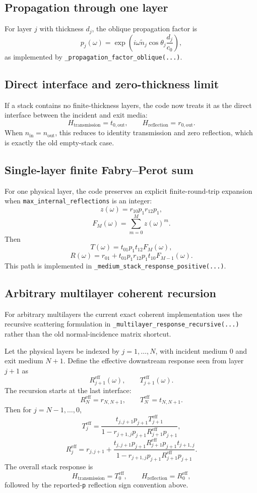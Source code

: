 \documentclass[11pt]{article}
\begin{document}
\subsection{Propagation through one layer}
For layer $j$ with thickness $d_j$, the oblique propagation factor is
\[
p_j(\omega)
=
\exp\!\left(
i \omega \tilde{n}_j \cos\theta_j \frac{d_j}{c_0}
\right),
\]
as implemented by \texttt{\_propagation\_factor\_oblique(...)}.

\subsection{Direct interface and zero-thickness limit}
If a stack contains no finite-thickness layers, the code now treats it as the direct interface
between the incident and exit media:
\[
H_{\text{transmission}} = t_{0,\text{out}},
\qquad
H_{\text{reflection}} = r_{0,\text{out}}.
\]
When $n_{\text{in}} = n_{\text{out}}$, this reduces to identity transmission and zero
reflection, which is exactly the old empty-stack case.

\subsection{Single-layer finite Fabry--Perot sum}
For one physical layer, the code preserves an explicit finite-round-trip expansion when
\texttt{max\_internal\_reflections} is an integer:
\[
z(\omega) = r_{10} p_1 r_{12} p_1,
\]
\[
F_M(\omega) = \sum_{m=0}^{M} z(\omega)^m.
\]
Then
\[
T(\omega) = t_{01} p_1 t_{12} F_M(\omega),
\]
\[
R(\omega) = r_{01} + t_{01} p_1 r_{12} p_1 t_{10} F_{M-1}(\omega).
\]
This path is implemented in \texttt{\_medium\_stack\_response\_positive(...)}.

\subsection{Arbitrary multilayer coherent recursion}
For arbitrary multilayers the current exact coherent implementation uses the recursive
scattering formulation in \texttt{\_multilayer\_response\_recursive(...)} rather than the old
normal-incidence matrix shortcut.

Let the physical layers be indexed by $j=1,\dots,N$, with incident medium $0$ and exit medium
$N+1$. Define the effective downstream response seen from layer $j+1$ as
\[
R_{j+1}^{\mathrm{eff}}(\omega),
\qquad
T_{j+1}^{\mathrm{eff}}(\omega).
\]
The recursion starts at the last interface:
\[
R_N^{\mathrm{eff}} = r_{N,N+1},
\qquad
T_N^{\mathrm{eff}} = t_{N,N+1}.
\]
Then for $j=N-1,\dots,0$,
\[
T_j^{\mathrm{eff}}
=
\frac{t_{j,j+1} p_{j+1} T_{j+1}^{\mathrm{eff}}}
{1-r_{j+1,j} p_{j+1} R_{j+1}^{\mathrm{eff}} p_{j+1}},
\]
\[
R_j^{\mathrm{eff}}
=
r_{j,j+1}
+
\frac{t_{j,j+1} p_{j+1} R_{j+1}^{\mathrm{eff}} p_{j+1} t_{j+1,j}}
{1-r_{j+1,j} p_{j+1} R_{j+1}^{\mathrm{eff}} p_{j+1}}.
\]
The overall stack response is
\[
H_{\text{transmission}} = T_0^{\mathrm{eff}},
\qquad
H_{\text{reflection}} = R_0^{\mathrm{eff}},
\]
followed by the reported-\texttt{p} reflection sign convention above.
\end{document}
